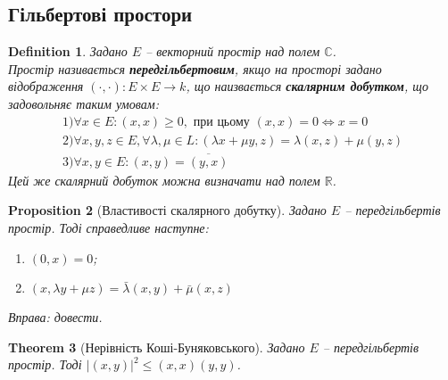 \documentclass[a4paper, 10pt]{article}
\theoremstyle{theoremdd}
\newtheorem{theorem}{Theorem}[subsection]
\newtheorem{definition}[theorem]{Definition}
\newtheorem{proposition}[theorem]{Proposition}
\begin{document}
\subsection{Гільбертові простори}
\begin{definition}
Задано $E$ -- векторний простір над полем $\mathbb{C}$.\\
Простір називається \textbf{передгільбертовим}, якщо на просторі задано відображення $(\cdot,\cdot) \colon E \times E \to k$, що наизвається \textbf{скалярним добутком}, що задовольняє таким умовам:
\begin{align*}
1)\forall x \in E: (x,x) \geq 0, \text{ при цьому } (x,x) = 0 \iff x = 0 \\
2)\forall x,y,z \in E, \forall \lambda,\mu \in L: (\lambda x + \mu y, z) = \lambda(x,z) + \mu(y,z) \\
3) \forall x,y \in E: (x,y) = \overline{(y,x)}
\end{align*}
Цей же скалярний добуток можна визначати над полем $\mathbb{R}$.
\end{definition}

\begin{proposition}[Властивості скалярного добутку]
Задано $E$ -- передгільбертів простір. Тоді справедливе наступне:
\begin{enumerate}[nosep,wide=0pt,label={\arabic*)}]
\item $(0,x) = 0$;
\item $(x, \lambda y + \mu z) = \bar{\lambda}(x,y) + \bar{\mu}(x,z)$
\end{enumerate}
\textit{Вправа: довести.}
\end{proposition}

\begin{theorem}[Нерівність Коші-Буняковського]
Задано $E$ -- передгільбертів простір. Тоді $|(x,y)|^2 \leq (x,x) (y,y)$.
\end{theorem}
\end{document}
